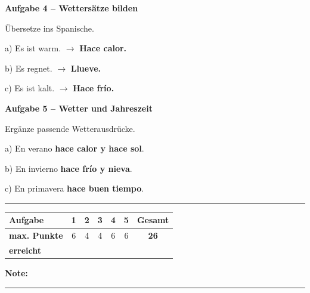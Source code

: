 \documentclass[11pt, a4paper]{article}
\newcommand{\fachfarbe}{spanisch}
\newcommand{\punktebox}[1]{\hfill\fbox{\small \_/#1}}
\newcommand{\luecke}[1]{\rule{#1}{0.4pt}}
\newcommand{\lsg}[1]{\textcolor{loesung}{\textbf{#1}}}
\newenvironment{aufgabe}[1]{%
    \needspace{5\baselineskip}%
    \nopagebreak[4]%
    \vspace{10pt}
    \noindent\textbf{\textcolor{\fachfarbe}{Aufgabe #1}}
    \nopagebreak[4]%
    \vspace{5pt}
    \nopagebreak[4]%
    \begin{list}{}{\leftmargin=0pt}
    \item[]
}{%
    \end{list}
}
\begin{document}
\vspace{15pt}


\begin{aufgabe}{4 -- Wettersätze bilden}
Übersetze ins Spanische. \punktebox{6}
\end{aufgabe}

\noindent
a) Es ist warm. $\rightarrow$ \lsg{Hace calor.}

\vspace{0.8em}

\noindent
b) Es regnet. $\rightarrow$ \lsg{Llueve.}

\vspace{0.8em}

\noindent
c) Es ist kalt. $\rightarrow$ \lsg{Hace frío.}

\vspace{15pt}


\begin{aufgabe}{5 -- Wetter und Jahreszeit}
Ergänze passende Wetterausdrücke. \punktebox{6}
\end{aufgabe}

\noindent
a) En verano \lsg{hace calor y hace sol}.

\vspace{0.8em}

\noindent
b) En invierno \lsg{hace frío y nieva}.

\vspace{0.8em}

\noindent
c) En primavera \lsg{hace buen tiempo}.


\vspace{25pt}
\hrule
\vspace{10pt}

\noindent
\begin{tabularx}{\textwidth}{|X|c|c|c|c|c||c|}
\hline
\textbf{Aufgabe} & 1 & 2 & 3 & 4 & 5 & \textbf{Gesamt} \\
\hline
\textbf{max. Punkte} & 6 & 4 & 4 & 6 & 6 & \textbf{26} \\
\hline
\textbf{erreicht} & & & & & & \\[0.8em]
\hline
\end{tabularx}

\vspace{10pt}

\begin{flushright}
\textbf{Note:} \luecke{2cm}
\end{flushright}
\end{document}
